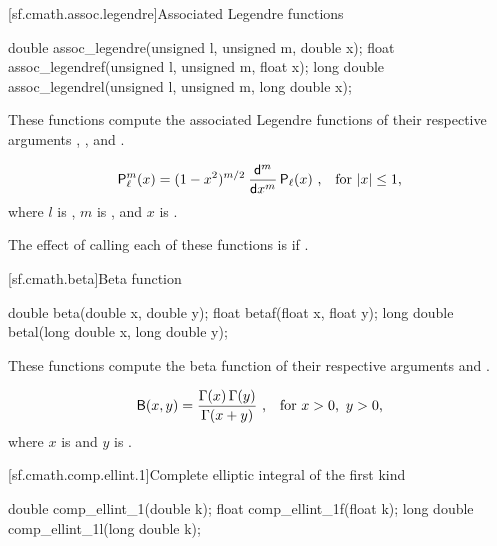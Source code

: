 [sf.cmath.assoc.legendre]{Associated Legendre functions}%
%
%
%
%
%
\begin{itemdecl}
double       assoc_legendre(unsigned l, unsigned m, double x);
float        assoc_legendref(unsigned l, unsigned m, float x);
long double  assoc_legendrel(unsigned l, unsigned m, long double x);
\end{itemdecl}

\begin{itemdescr}

\pnum
\effects
These functions compute
the associated Legendre functions
of their respective arguments
, , and .

\pnum
\returns
\[ \mathsf{P}_\ell^m(x) = (1 - x^2) ^ {m/2} \:
   \frac{\mathsf{d} ^ m}{\mathsf{d}x ^ m} \, \mathsf{P}_\ell(x)
   \text{ ,\quad for $|x| \le 1$,} \]
where
$l$ is ,
$m$ is , and
$x$ is .

\pnum
\remarks
The effect of calling each of these functions
is 
if .
\end{itemdescr}

[sf.cmath.beta]{Beta function}%
%
%
%
%
%
\begin{itemdecl}
double       beta(double x, double y);
float        betaf(float x, float y);
long double  betal(long double x, long double y);
\end{itemdecl}

\begin{itemdescr}
\pnum
\effects
These functions compute
the beta function
of their respective arguments
 and .

\pnum
\returns
\[ \mathsf{B}(x, y) = \frac{\Gamma(x) \, \Gamma(y)}{\Gamma(x + y)}
   \text{ ,\quad for $x > 0$,\, $y > 0$,} \]
where
$x$ is  and
$y$ is .
\end{itemdescr}

[sf.cmath.comp.ellint.1]{Complete elliptic integral of the first kind}%
%
%
%
%
%
\begin{itemdecl}
double       comp_ellint_1(double k);
float        comp_ellint_1f(float k);
long double  comp_ellint_1l(long double k);
\end{itemdecl}

